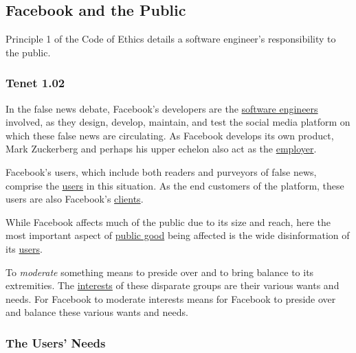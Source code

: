 
\subsection{Facebook and the Public}

\par Principle 1 of the Code of Ethics details a software engineer's responsibility to the public. \cite{se_code}

\subsubsection{Tenet 1.02}


\par In the false news debate, Facebook's developers are the \ul{software engineers} involved, as they design, develop, maintain, and test the social media platform on which these false news are circulating. As Facebook develops its own product, Mark Zuckerberg and perhaps his upper echelon also act as the \ul{employer}. 

\par Facebook's users, which include both readers and purveyors of false news, comprise the \ul{users} in this situation. As the end customers of the platform, these users are also Facebook's \ul{clients}.

\par While Facebook affects much of the public due to its size and reach, here the most important aspect of \ul{public good} being affected is the wide disinformation of its \ul{users}.

\par To \emph{moderate} something means to preside over and to bring balance to its extremities. \cite{merriam_webster} The \ul{interests} of these disparate groups are their various wants and needs. For Facebook to moderate interests means for Facebook to preside over and balance these various wants and needs. 


\subsubsection{The Users' Needs}


